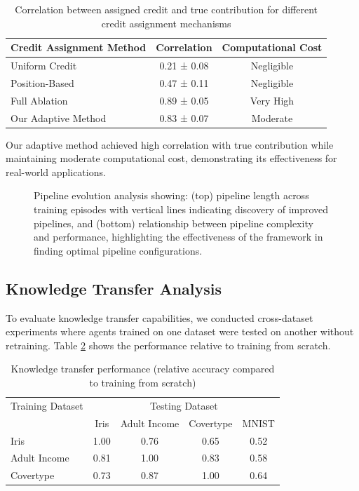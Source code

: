 \documentclass[twoside,11pt]{article}
\begin{document}
\begin{table}[ht]
\centering
\caption{Correlation between assigned credit and true contribution for  different credit assignment mechanisms}
\label{tab:credit}
\begin{tabular}{lcc}
\toprule
    Credit Assignment Method & Correlation & Computational Cost \\
\midrule
    Uniform Credit & 0.21 ± 0.08 & Negligible \\
    Position-Based & 0.47 ± 0.11 & Negligible \\
    Full Ablation & 0.89 ± 0.05 & Very High \\
    Our Adaptive Method & 0.83 ± 0.07 & Moderate \\
\bottomrule
\end{tabular}
\end{table}

Our adaptive method achieved high correlation with true contribution while maintaining moderate computational cost, demonstrating its effectiveness for real-world applications.

\begin{figure}[ht]
\centering
{}
\caption{Pipeline evolution analysis showing: (top) pipeline length across training episodes with vertical lines indicating discovery of improved pipelines, and (bottom) relationship between pipeline complexity and performance, highlighting the effectiveness of the framework in finding optimal pipeline configurations.}
\label{fig:pipeline_evolution}
\end{figure}

\subsection{Knowledge Transfer Analysis}

To evaluate knowledge transfer capabilities, we conducted cross-dataset experiments where agents trained on one dataset were tested on another without retraining. Table \ref{tab:transfer} shows the performance relative to training from scratch.

\begin{table}[ht]
\centering
\caption{Knowledge transfer performance (relative accuracy compared to training from scratch)}
\label{tab:transfer}
\begin{tabular}{lcccc}
\toprule
Training Dataset & \multicolumn{4}{c}{Testing Dataset} \\
 & Iris & Adult Income & Covertype & MNIST \\
\midrule
Iris & 1.00 & 0.76 & 0.65 & 0.52 \\
Adult Income & 0.81 & 1.00 & 0.83 & 0.58 \\
Covertype & 0.73 & 0.87 & 1.00 & 0.64 \\
\bottomrule
\end{tabular}
\end{table}
\end{document}

